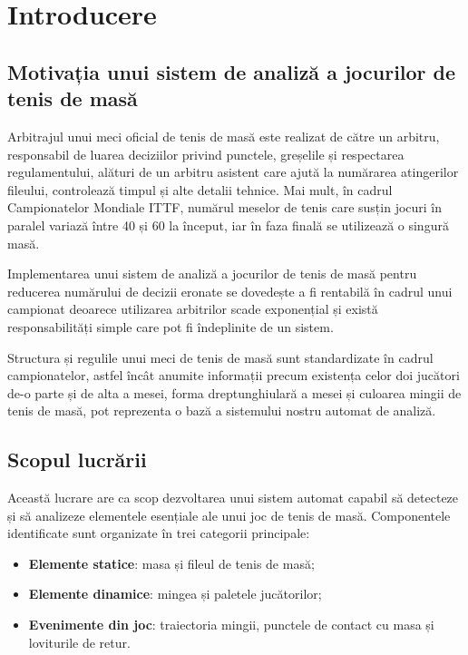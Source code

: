 \chapter{Introducere}

\section{Motivația unui sistem de analiză a jocurilor de tenis de masă}
Arbitrajul unui meci oficial de tenis de masă este realizat de către un arbitru, responsabil de luarea deciziilor privind punctele, greșelile și respectarea regulamentului, alături de un arbitru asistent care ajută la numărarea atingerilor fileului, controlează timpul și alte detalii tehnice. Mai mult, în cadrul Campionatelor Mondiale ITTF, numărul meselor de tenis care susțin jocuri în paralel variază între 40 și 60 la început, iar în faza finală se utilizează o singură masă.

 Implementarea unui sistem de analiză a jocurilor de tenis de masă pentru reducerea numărului de decizii eronate se dovedește a fi rentabilă în cadrul unui campionat deoarece utilizarea arbitrilor scade exponențial și există responsabilități simple care pot fi îndeplinite de un sistem.

 Structura și regulile unui meci de tenis de masă sunt standardizate în cadrul campionatelor, astfel încât anumite informații precum existența celor doi jucători de-o parte și de alta a mesei, forma dreptunghiulară a mesei și culoarea mingii de tenis de masă, pot reprezenta o bază a sistemului nostru automat de analiză.

 
\section{Scopul lucrării}
Această lucrare are ca scop dezvoltarea unui sistem automat capabil să detecteze și să analizeze elementele esențiale ale unui joc de tenis de masă. Componentele identificate sunt organizate în trei categorii principale:

\begin{itemize}
    \item \textbf{Elemente statice}: masa și fileul de tenis de masă;  
    \item \textbf{Elemente dinamice}: mingea și paletele jucătorilor; 
    \item \textbf{Evenimente din joc}: traiectoria mingii, punctele de contact cu masa și loviturile de retur.  
\end{itemize}

